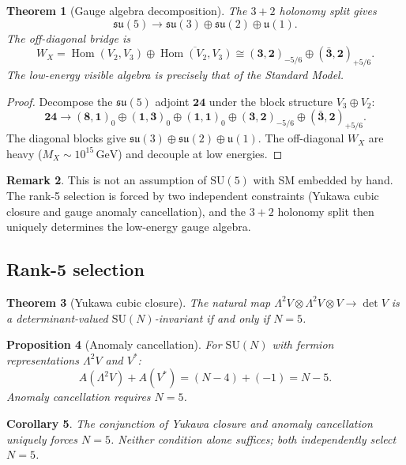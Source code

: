 \documentclass[12pt]{article}
\theoremstyle{plain}
\newtheorem{theorem}{Theorem}[section]
\newtheorem{proposition}[theorem]{Proposition}
\newtheorem{corollary}[theorem]{Corollary}
\theoremstyle{definition}
\newtheorem{remark}[theorem]{Remark}
\numberwithin{equation}{section}
\begin{document}
\begin{theorem}[Gauge algebra decomposition]\label{thm:gaugedecomp}
The $3+2$ holonomy split gives
\[
\mathfrak{su}(5)\to\mathfrak{su}(3)\oplus\mathfrak{su}(2)\oplus\mathfrak{u}(1).
\]
The off-diagonal bridge is
\[
W_X = \operatorname{Hom}(V_2,V_3)\oplus\overline{\operatorname{Hom}(V_2,V_3)}
\cong (\mathbf{3},\mathbf{2})_{-5/6}\oplus(\bar{\mathbf{3}},\mathbf{2})_{+5/6}.
\]
The low-energy visible algebra is precisely that of the Standard Model.
\end{theorem}

\begin{proof}
Decompose the $\mathfrak{su}(5)$ adjoint $\mathbf{24}$ under the block
structure $V_3\oplus V_2$:
\[
\mathbf{24}\to(\mathbf{8},\mathbf{1})_0\oplus(\mathbf{1},\mathbf{3})_0
\oplus(\mathbf{1},\mathbf{1})_0\oplus(\mathbf{3},\mathbf{2})_{-5/6}
\oplus(\bar{\mathbf{3}},\mathbf{2})_{+5/6}.
\]
The diagonal blocks give $\mathfrak{su}(3)\oplus\mathfrak{su}(2)\oplus\mathfrak{u}(1)$.
The off-diagonal $W_X$ are heavy ($M_X\sim10^{15}\,\mathrm{GeV}$)
and decouple at low energies.
\end{proof}

\begin{remark}
This is not an assumption of $\mathrm{SU}(5)$ with SM embedded by hand.
The rank-5 selection is forced by two independent constraints
(Yukawa cubic closure and gauge anomaly cancellation), and the $3+2$
holonomy split then uniquely determines the low-energy gauge algebra.
\end{remark}

\subsection{Rank-5 selection}\label{sec:rank5}

\begin{theorem}[Yukawa cubic closure]\label{thm:yukawa}
The natural map $\Lambda^2 V\otimes\Lambda^2 V\otimes V\to\det V$
is a determinant-valued $\mathrm{SU}(N)$-invariant if and only if $N=5$.
\end{theorem}

\begin{proposition}[Anomaly cancellation]\label{prop:anomaly}
For $\mathrm{SU}(N)$ with fermion representations $\Lambda^2 V$ and $V^*$:
\[
A(\Lambda^2 V)+A(V^*) = (N-4)+(-1) = N-5.
\]
Anomaly cancellation requires $N=5$.
\end{proposition}

\begin{corollary}
The conjunction of Yukawa closure and anomaly cancellation uniquely forces
$N=5$.  Neither condition alone suffices; both independently select $N=5$.
\end{corollary}
\end{document}
